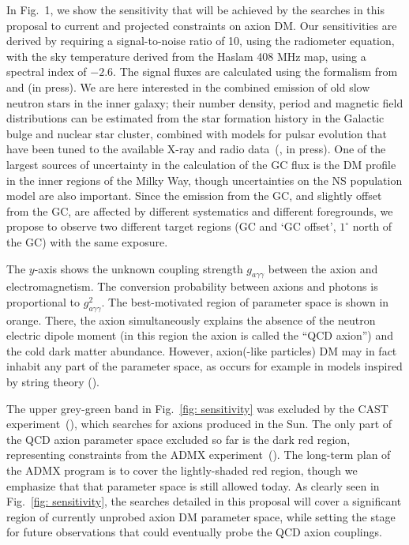 \documentclass[a4paper, 11pt]{article}
\begin{document}
\medskip
 
In Fig.~1, we show the sensitivity that will be achieved by the searches in this proposal to current and projected constraints on axion DM. Our sensitivities are derived by requiring a signal-to-noise ratio of 10, using the radiometer equation, with the sky temperature derived from the Haslam 408 MHz map, using a spectral index of $-2.6$.  The signal fluxes are calculated using the formalism from \cite{Hook:2018iia} and \cite{SafdiToAppear} (in press).  We are here interested in the combined emission of old slow neutron stars in the inner galaxy; their number density, period and magnetic field distributions can be estimated from the star formation history in the Galactic bulge and nuclear star cluster, combined with models for pulsar evolution that have been tuned to the available X-ray and radio data~(\cite{SafdiToAppear}, in press).  One of the largest sources of uncertainty in the calculation of the GC flux is the DM profile in the inner regions of the Milky Way, though uncertainties on the NS population model are also important.   Since the emission from the GC, and slightly offset from the GC, are affected by different systematics and different foregrounds, we propose to observe two different target regions (GC and `GC offset', $1^\circ$ north of the GC) with the same exposure.

The $y$-axis shows the unknown coupling strength $g_{a \gamma \gamma}$ between the axion and electromagnetism.  The conversion probability between axions and photons is proportional to $g_{a \gamma \gamma}^2$.  The best-motivated region of parameter space is shown in orange.  There, the axion simultaneously explains the absence of the neutron electric dipole moment (in this region the axion is called the ``QCD axion'') and the cold dark matter abundance.  However, axion(-like particles) DM may in fact inhabit any part of the parameter space, as occurs for example in models inspired by string theory (\cite{Svrcek:2006yi}).

The upper grey-green band in Fig.~\ref{fig: sensitivity} was excluded by the CAST experiment~(\cite{Arik:2015cjv}), which searches for axions produced in the Sun.  The only part of the QCD axion parameter space excluded so far is the dark red region, representing constraints from the ADMX experiment~(\cite{Du:2018uak}).  The long-term plan of the ADMX program is to cover the lightly-shaded red region, though we emphasize that that parameter space is still allowed today.  As clearly seen in Fig.~\ref{fig: sensitivity}, the searches detailed in this proposal will cover a significant region of currently unprobed axion DM parameter space, while setting the stage for future observations that could eventually probe the QCD axion couplings. 
\end{document}
